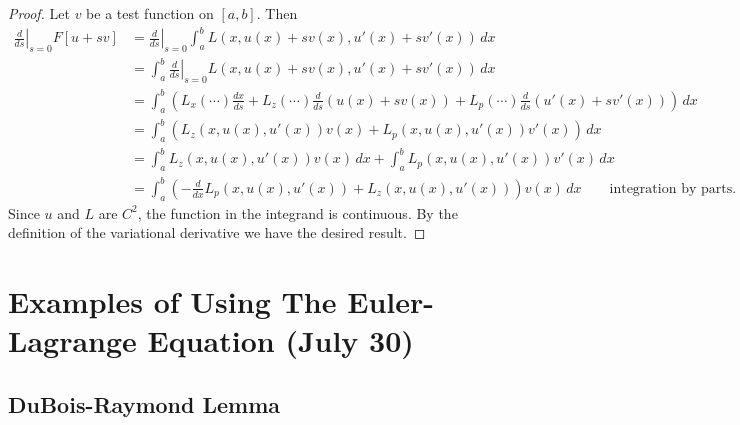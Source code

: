 \documentclass[11pt]{book}
\begin{document}
\begin{proof}
Let $v$ be a test function on $[a,b]$. Then
\begin{align*}
\left. \frac{d}{ds} \right|_{s=0} F[u + sv] &= \left. \frac{d}{ds} \right|_{s=0} \int_a^b L(x, u(x) + sv(x), u'(x) + sv'(x)) \, dx \\
&=  \int_a^b \left. \frac{d}{ds} \right|_{s=0} L(x, u(x) + sv(x), u'(x) + sv'(x)) \, dx \\
&= \int_a^b \left( L_x(\cdots) \frac{dx}{ds} + L_z(\cdots)\frac{d}{ds}(u(x) + sv(x)) + L_p(\cdots)\frac{d}{ds}(u'(x) + sv'(x)) \right) \, dx \\
&= \int_a^b \left( L_z(x,u(x),u'(x))v(x) + L_p(x,u(x),u'(x))v'(x) \right)\, dx \\
&= \int_a^b L_z(x,u(x),u'(x))v(x) \, dx + \int_a^b L_p(x,u(x),u'(x))v'(x) \, dx \\
&= \int_a^b \left( -\frac{d}{dx} L_p(x,u(x),u'(x)) + L_z(x,u(x),u'(x)) \right) v(x) \, dx \qquad \text{integration by parts.}
\end{align*}
Since $u$ and $L$ are $C^2$, the function in the integrand is continuous. By the definition of the variational derivative we have the desired result.
\end{proof}

\newpage

\section{Examples of Using The Euler-Lagrange Equation (July 30)}

\subsection{DuBois-Raymond Lemma}
\end{document}
